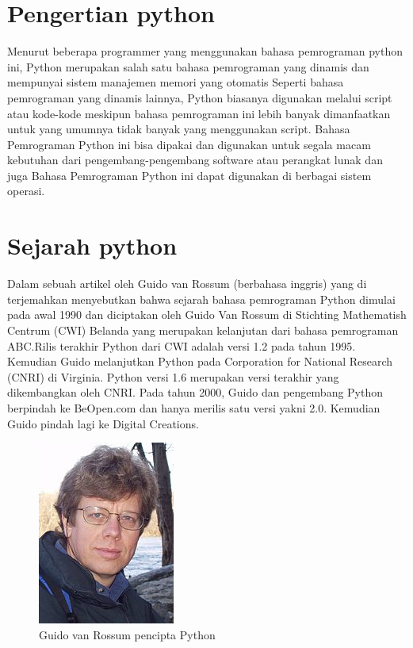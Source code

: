 
\section{Pengertian python}
     
      Menurut beberapa  programmer yang menggunakan bahasa pemrograman python ini, Python merupakan salah satu bahasa pemrograman 
      yang dinamis dan mempunyai sistem manajemen memori yang otomatis Seperti bahasa pemrograman yang dinamis lainnya, Python 
      biasanya digunakan melalui script atau kode-kode meskipun bahasa pemrograman ini lebih banyak dimanfaatkan untuk yang umumnya
      tidak banyak yang menggunakan script. Bahasa Pemrograman Python ini bisa dipakai dan digunakan untuk segala macam kebutuhan 
      dari pengembang-pengembang software atau perangkat lunak dan juga Bahasa Pemrograman Python ini dapat digunakan di berbagai 
      sistem operasi.
      
\section {Sejarah python}
 
      Dalam sebuah artikel oleh Guido van Rossum (berbahasa inggris) yang di terjemahkan menyebutkan bahwa sejarah bahasa pemrograman 
      Python dimulai pada awal 1990 dan diciptakan oleh Guido Van Rossum di Stichting Mathematish Centrum (CWI) Belanda yang merupakan 
      kelanjutan dari bahasa pemrograman ABC.Rilis terakhir Python dari CWI adalah versi 1.2 pada tahun 1995. Kemudian Guido melanjutkan 
      Python pada Corporation for National Research (CNRI) di Virginia. Python versi 1.6 merupakan versi terakhir yang dikembangkan oleh 
      CNRI. Pada tahun 2000, Guido dan pengembang Python berpindah ke BeOpen.com dan hanya merilis satu versi yakni 2.0. Kemudian 
      Guido pindah lagi ke Digital Creations.

	\begin{figure}[ht]
	\centerline{\includegraphics[width=.5\textwidth]{figures/Guido.png}}
	\caption{Guido van Rossum pencipta Python}
	\label{Guido}
	\end{figure}
      
